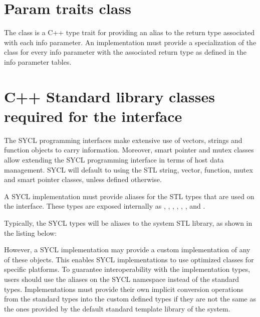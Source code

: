 \section{Param traits class}
\label{sec:param-traits}

The class  is a C++ type trait for providing an alias to the return type associated with each info parameter. An implementation must provide a specialization of the  class for every info
parameter with the associated return type as defined in the info
parameter tables.


\section{C++ Standard library classes required for the interface}
\label{sec:stlclasses}

The SYCL programming interfaces make extensive use of vectors, strings
and function objects to carry information. Moreover, smart pointer
and mutex classes allow extending the SYCL programming interface in
terms of host data management. SYCL will default to using the STL
string, vector, function, mutex and smart pointer classes, unless
defined otherwise.

A SYCL implementation must provide aliases for the STL types that 
are used on the interface. 
These types are exposed internally as
,
,
,
,
,
,
 and
.

Typically, the SYCL types will be aliases to the system 
STL library, as shown in the listing below:


However, a SYCL implementation may provide a custom implementation 
of any of these objects. 
This enables SYCL implementations to use optimized classes for specific
platforms.
To guarantee interoperability with the implementation types, users should
use the aliases on the SYCL namespace instead of the standard types.
Implementations must provide their own implicit conversion operations from the 
standard types into the custom defined types if they are not the same
as the ones provided by the default standard template library of the system.

